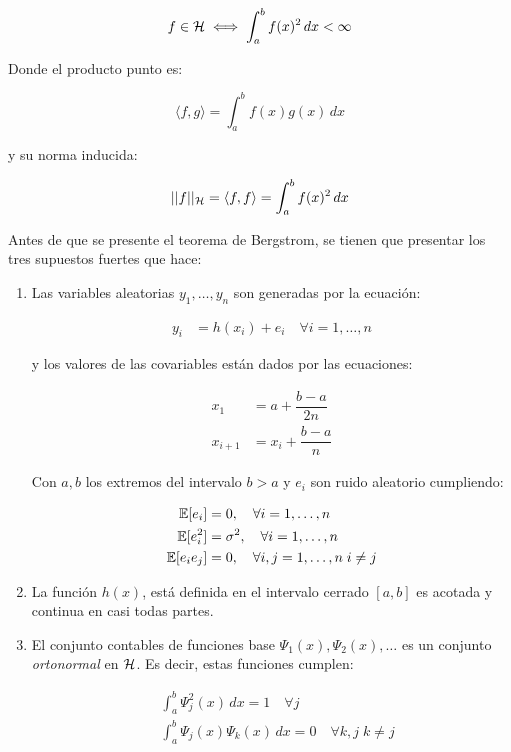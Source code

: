 \documentclass[../Main/Main.tex]{subfiles}
\begin{document}
$$f \in \mathcal{H} \iff \int_a^b f(x)^2 \,dx < \infty$$

Donde el producto punto es:

$$\langle f,g\rangle = \int_a^b f(x)g(x) \,dx$$

y su norma inducida:

$$||f||_{\mathcal{H}} = \langle f,f\rangle = \int_a^b f(x)^2 \,dx $$

Antes de que se presente el teorema de Bergstrom, se tienen que presentar los tres supuestos fuertes que hace:

\begin{enumerate}
	\item Las variables aleatorias $y_1,\ldots,y_n$ son generadas por la ecuación:
	
	\begin{align*}
		y_i &= h(x_i) + e_i \quad \forall i =1,\ldots,n
	\end{align*}
	
	y los valores de las covariables están dados por las ecuaciones:
	
	\begin{align}
		x_1 &= a + \dfrac{b-a}{2n} \\ \label{ec:ProcesoGenX}
		x_{i+1} &= x_i + \dfrac{b-a}{n} \nonumber
	\end{align}
	
	Con $a,b$ los extremos del intervalo $b>a$ y $e_i$ son ruido aleatorio cumpliendo:
	
	\begin{align}
		\mathbb{E}[e_i] &= 0, \quad \forall i = 1,\ldots,n \\ 
		\mathbb{E}[e_i^2] &= \sigma^2, \quad \forall i = 1,\ldots,n 	\nonumber \\ 
		\mathbb{E}[e_ie_j] &= 0, \quad \forall i,j = 1,\ldots,n \; i\neq j	\nonumber		
	\end{align}
	
	\item La función $h(x)$, está definida en el intervalo cerrado $[a,b]$ es acotada y continua en casi todas partes.
	
	\item El conjunto contables de funciones base $\Psi_1(x), \Psi_2(x),\ldots$ es un conjunto \textit{ortonormal} en $\mathcal{H}$. Es decir, estas funciones cumplen:
	
	\begin{align}
		&\int_a^b \Psi_j^2(x)\,dx = 1 \quad \forall j \\[2pt]
		&\int_a^b \Psi_j(x)\Psi_k(x) \,dx = 0 \quad \forall k,j\; k \neq j \nonumber
	\end{align}
\end{enumerate}
\end{document}
